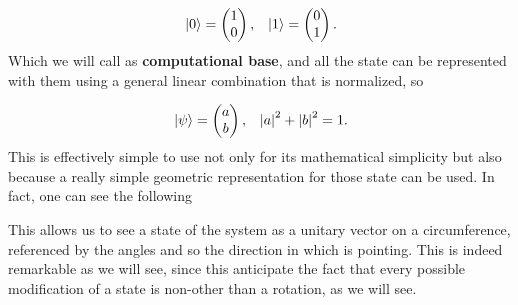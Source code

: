 \begin{align*}
    &\ket{0} = \begin{pmatrix}
        1\\
        0
    \end{pmatrix},
    &\ket{1} = \begin{pmatrix}
        0\\
        1
    \end{pmatrix}.
\end{align*}
Which we will call as \textbf{computational base}, and all the state can be represented with them using a general linear combination that is normalized, so

\begin{align*}
    &\ket{\psi} = \begin{pmatrix}
        a\\
        b
    \end{pmatrix},
    & \abs{a}^2 + \abs{b}^2 = 1.
\end{align*}
This is effectively simple to use not only for its mathematical simplicity but also because a really simple geometric representation for those state can be used. In fact, one can see the following


\noindent
This allows us to see a state of the system as a unitary vector on a circumference, referenced by the angles and so the direction in which is pointing. This is indeed remarkable as we will see, since this anticipate the fact that every possible modification of a state is non-other than a rotation, as we will see.

